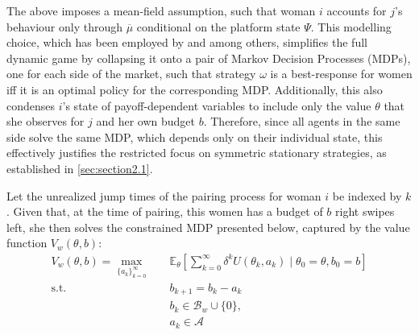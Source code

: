 The above imposes a mean-field assumption, such that woman $i$ accounts for $j$'s behaviour only through $\overline\mu$ conditional on the platform state $\Psi$.
This modelling choice, which has been employed by \cite{immorlica2021designing} and \cite{iyer2014mean} among others, simplifies the full dynamic game by collapsing it onto a pair of Markov Decision Processes (MDPs), one for each side of the market, such that strategy $\omega$ is a best-response for women iff it is an optimal policy for the corresponding MDP. 
Additionally, this also condenses $i$'s state of payoff-dependent variables to include only the value $\theta$ that she observes for $j$ and her own budget $b$. 
Therefore, since all agents in the same side solve the same MDP, which depends only on their individual state, this effectively justifies the restricted focus on symmetric stationary strategies, as established in \autoref{sec:section2.1}.

Let the unrealized jump times of the pairing process for woman $i$ be indexed by $k$. 
Given that, at the time of pairing, this women has a budget of $b$ right swipes left, she then solves the constrained MDP presented below, captured by the value function $V_w(\theta,b)$: 
\begin{equation*}
    \begin{aligned} 
        V_w(\theta,b)=\max_{\{a_k\}^\infty_{k=0}} \quad & \mathbb{E}_{\theta}\left[\sum^\infty_{k=0} \delta^{k} U(\theta_k, a_k) \;|\; \theta_0=\theta, b_0=b\right]\\ 
        \textrm{s.t.} \quad & b_{k+1} = b_k -a_k \\
        & b_k\in \mathcal{B}_w \cup \{0\},\\
        & a_k\in \mathcal{A}  
    \end{aligned}
\end{equation*}

